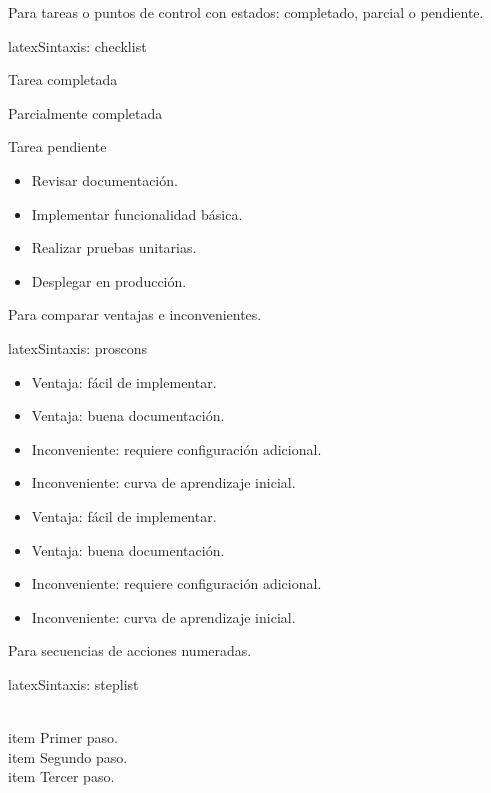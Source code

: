 Para tareas o puntos de control con estados: completado, parcial o pendiente.

\begin{codigosimple}{latex}{Sintaxis: checklist}
\begin{checklist}
  \item \checked{} Tarea completada
  \item \partialchecked{} Parcialmente completada
  \item \unchecked{} Tarea pendiente
\end{checklist}
\end{codigosimple}

\begin{itemize}
  \item Revisar documentación.
  \item Implementar funcionalidad básica.
  \item Realizar pruebas unitarias.
  \item Desplegar en producción.
\end{itemize}

Para comparar ventajas e inconvenientes.

\begin{codigosimple}{latex}{Sintaxis: proscons}
\begin{itemize}
  \item Ventaja: fácil de implementar.
  \item Ventaja: buena documentación.
  \item Inconveniente: requiere configuración adicional.
  \item Inconveniente: curva de aprendizaje inicial.
\end{itemize}
\end{codigosimple}

\begin{itemize}
  \item Ventaja: fácil de implementar.
  \item Ventaja: buena documentación.
  \item Inconveniente: requiere configuración adicional.
  \item Inconveniente: curva de aprendizaje inicial.
\end{itemize}

Para secuencias de acciones numeradas.

\begin{codigosimple}{latex}{Sintaxis: steplist}
\begin{enumerate}
  \\item Primer paso.
  \\item Segundo paso.
  \\item Tercer paso.
\end{enumerate}
\end{codigosimple}

